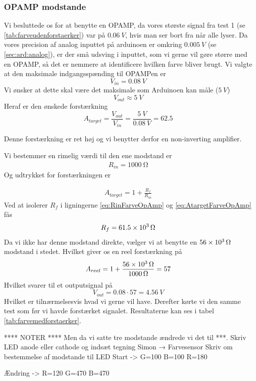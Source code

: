 \subsubsection{OPAMP modstande} \label{subs:opampanalog}
Vi besluttede os for at benytte en OPAMP, da vores største signal fra test 1 (se \ref{tab:farveudenforstaerker}) var på $\SI{0.06}{V}$, hvis man ser bort fra når alle lyser. Da vores precision af analog inputtet på arduinoen er omkring $\SI{0.005}{V}$ (se \ref{sec:ard:analog}), er der små udsving i inputtet, som vi gerne vil gøre større med en OPAMP, så det er nemmere at identificere hvilken farve bliver brugt.
Vi valgte at den maksimale indgangsspænding til OPAMPen er
\[
	V_{in} = \SI{0.08}{V}
\]
Vi ønsker at dette skal være det maksimale som Arduinoen kan måle ($\SI{5}{V}$)
\[
	V_{out} \approx \SI{5}{V}
\]
Heraf er den ønskede forstærkning
\[
	A_{target} = \frac{V_{out}}{V_{in}} = \frac{\SI{5}{V}}{\SI{0.08}{V}}=62.5
\]

Denne forstærkning er ret høj og vi benytter derfor en non-inverting amplifier.

Vi bestemmer en rimelig værdi til den ene modstand er
\begin{align}
	R_{in} = \SI{1000}{\ohm} \label{eq:RinFarveOpAmp}
\end{align}
Og udtrykket for forstærkningen er

\begin{align}
	A_{target} = 1+\frac{R_f}{R_{in}} \label{eq:AtargetFarveOpAmp}
\end{align}
Ved at isolerer $R_f$ i ligningerne \ref{eq:RinFarveOpAmp} og \ref{eq:AtargetFarveOpAmp} fås
\[
	R_f = \SI{61.5d3}{\ohm}
\]
Da vi ikke har denne modstand direkte, vælger vi at benytte en $\SI{56d3}{\ohm}$ modstand i stedet. Hvilket giver os en reel forstærkning på
\[
	A_{reel} = 1 + \frac{\SI{56d3}{\ohm}}{\SI{1000}{\ohm}} = 57	
\]
Hvilket svarer til et outputsignal på
\[
	V_{out} = \SI{0.08}\cdot 57 = \SI{4.56}{V}
\]
Hvilket er tilnærmelsesvis hvad vi gerne vil have. Derefter kørte vi den samme test som før vi havde forstærket signalet. Resultaterne kan ses i tabel \ref{tab:farvemedforstaerker}.





**** NOTER ****
Men da vi satte tre modstande ændrede vi det til ***. 
Skriv LED anode eller cathode og indsæt tegning 
Simon → Farvesensor
Skriv om bestemmelse af modstande til LED
Start ->
G=100
B=100
R=180

Ændring ->
R=120
G=470
B=470

